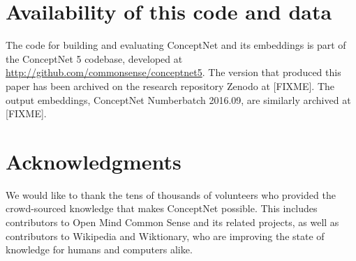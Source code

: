 \documentclass[letterpaper]{article}
\begin{document}
\section{Availability of this code and data}


The code for building and evaluating ConceptNet and its embeddings is part of
the ConceptNet 5 codebase, developed at \url{http://github.com/commonsense/conceptnet5}.
The version that produced this paper has been archived on the research repository
Zenodo at [FIXME]. The output embeddings, ConceptNet Numberbatch 2016.09, are similarly
archived at [FIXME].

\section{Acknowledgments}

We would like to thank the tens of thousands of volunteers who provided the
crowd-sourced knowledge that makes ConceptNet possible. This includes
contributors to Open Mind Common Sense and its related projects, as well as
contributors to Wikipedia and Wiktionary, who are improving the state of
knowledge for humans and computers alike.



\end{document}
